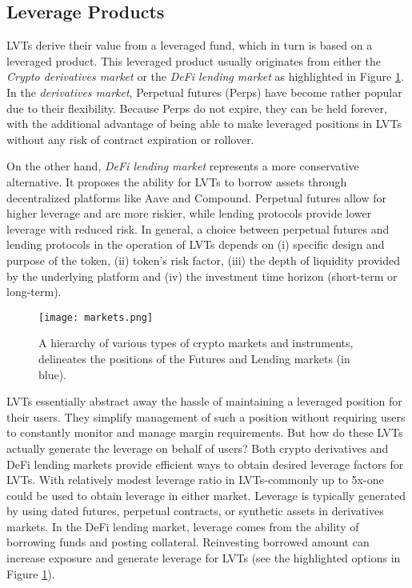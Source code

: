 \subsection{Leverage Products}
LVTs derive their value from a leveraged fund, which in turn is based on a leveraged product. This leveraged product usually originates from either the \textit{Crypto derivatives market} or the \textit{DeFi lending market} as highlighted in Figure \ref{fig:markets}. In the \textit{derivatives market}, Perpetual futures (Perps) have become rather popular due to their flexibility. Because Perps do not expire, they can be held forever, with the additional advantage of being able to make leveraged positions in LVTs without any risk of contract expiration or rollover.

On the other hand, \textit{DeFi lending market} represents a more conservative alternative. It proposes the ability for LVTs to borrow assets through decentralized platforms like Aave and Compound. Perpetual futures allow for higher leverage and are more riskier, while lending protocols provide lower leverage with reduced risk. In general, a choice between perpetual futures and lending protocols in the operation of LVTs depends on (i) specific design and purpose of the token, (ii) token's risk factor, (iii) the depth of liquidity provided by the underlying platform and (iv) the investment time horizon (short-term or long-term).

\begin{figure}[t]
	\texttt{[image: markets.png]}
	\caption[Crypto market hierarchy]{A hierarchy of various types of crypto markets and instruments, delineates the positions of the Futures and Lending markets (in blue).}
	\label{fig:markets}
\end{figure}

LVTs essentially abstract away the hassle of maintaining a leveraged position for their users. They simplify management of such a position without requiring users to constantly monitor and manage margin requirements. But how do these LVTs actually generate the leverage on behalf of users? Both crypto derivatives and DeFi lending markets provide efficient ways to obtain desired leverage factors for LVTs. With relatively modest leverage ratio in LVTs-commonly up to 5x-one could be used to obtain leverage in either market. Leverage is typically generated by using dated futures, perpetual contracts, or synthetic assets in derivatives markets. In the DeFi lending market, leverage comes from the ability of borrowing funds and posting collateral. Reinvesting borrowed amount can increase exposure and generate leverage for LVTs (see the highlighted options in Figure \ref{fig:markets}). 

